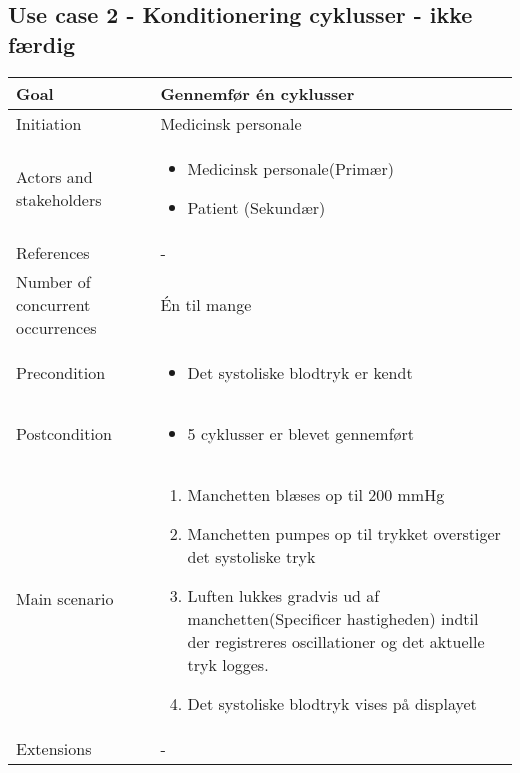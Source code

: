 	\subsection{Use case 2 - Konditionering cyklusser - ikke færdig}
		\begin{center}
			\begin{tabular}{ | m{4cm} | m{8cm}| } 
				\hline
				Goal& Gennemfør én cyklusser\\ 
				\hline
				Initiation &  Medicinsk personale\\
				\hline
				Actors and stakeholders & 
				\begin{itemize}
					\item Medicinsk personale(Primær)
					\item Patient (Sekundær)
				\end{itemize} \\ 
				\hline
				References & - \\ 
				\hline
				Number of concurrent occurrences & Én til mange\\ 
				\hline	
				Precondition & 
				\begin{itemize}
					\item Det systoliske blodtryk er kendt
				\end{itemize} \\ 
				\hline
				Postcondition & 
				\begin{itemize}
					\item 5 cyklusser er blevet gennemført 
				\end{itemize} \\ 
				\hline
				Main scenario & \begin{enumerate}
					\item Manchetten blæses op til 200 mmHg 
					\item Manchetten pumpes op til trykket overstiger det systoliske tryk
					\item Luften lukkes gradvis ud af manchetten(Specificer hastigheden) indtil der registreres oscillationer og det aktuelle tryk logges. 
					\item Det systoliske blodtryk vises på displayet
				\end{enumerate} \\ 
				\hline
				Extensions &  -\\ 
				\hline
			\end{tabular}
		\end{center}